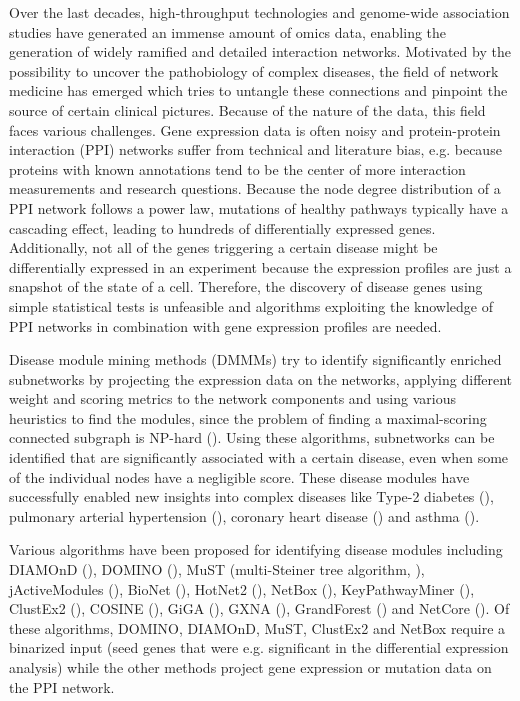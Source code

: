 \documentclass{bioinfo}
\begin{document}
Over the last decades, high-throughput technologies and genome-wide association studies have generated an immense amount of omics data, enabling the generation of widely ramified and detailed interaction networks. Motivated by the possibility to uncover the pathobiology of complex diseases, the field of network medicine has emerged which tries to untangle these connections and pinpoint the source of certain clinical pictures. 
Because of the nature of the data, this field faces various challenges. Gene expression data is often noisy and protein-protein interaction (PPI) networks suffer from technical and literature bias, e.g. because proteins with known annotations tend to be the center of more interaction measurements and research questions. Because the node degree distribution of a PPI network follows a power law, mutations of healthy pathways typically have a cascading effect, leading to hundreds of differentially expressed genes. Additionally, not all of the genes triggering a certain disease might be differentially expressed in an experiment because the expression profiles are just a snapshot of the state of a cell. Therefore, the discovery of disease genes using simple statistical tests is unfeasible and algorithms exploiting the knowledge of PPI networks in combination with gene expression profiles are needed. 

Disease module mining methods (DMMMs)  try to identify significantly enriched subnetworks by projecting the expression data on the networks, applying different weight and scoring metrics to the network components and using various heuristics to find the modules, since the problem of finding a maximal-scoring connected subgraph is NP-hard (\cite{np_ideker2002}). Using these algorithms, subnetworks can be identified that are significantly associated with a certain disease, even when some of the individual nodes have a negligible score. These disease modules have successfully enabled new insights into complex diseases like Type-2 diabetes (\cite{diabetes_sharma2018, diabetes_fernandez2019}), pulmonary arterial hypertension (\cite{pulmonary_samokhin2018}), coronary heart disease (\cite{coronary_wang2018}) and asthma (\cite{asthma_sharma2015}).

Various algorithms have been proposed for identifying disease modules including DIAMOnD (\cite{diamond_ghiassian2015}), DOMINO (\cite{domino_levi2021}), MuST (multi-Steiner tree algorithm, \cite{covex_sadegh2020}), %
jActiveModules (\cite{np_ideker2002}), BioNet (\cite{bionet_beisser2010}), HotNet2 (\cite{hotnet2_leiserson2015}), NetBox (\cite{netbox_cerami2010}), KeyPathwayMiner (\cite{keypathwayminer_alcaraz2011, keypathway_baumbach2012, keypathwayminer_alcaraz2014, keypathwayminerweb_list2016}), %
ClustEx2 (\cite{clustex2_ding2018}), COSINE (\cite{cosine_ma2011}), GiGA (\cite{giga_breitling2004}), GXNA (\cite{gnax_nacu2007}), GrandForest (\cite{grandforest_larsen2020}) and NetCore (\cite{netcore_barel2020}). Of these algorithms, DOMINO, DIAMOnD, MuST, ClustEx2 and NetBox require a binarized input (seed genes that were e.g. significant in the differential expression analysis) while the other methods project gene expression or mutation data on the PPI network. 
\end{document}
